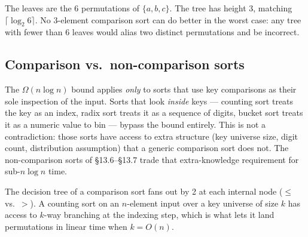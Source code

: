 \documentclass[11pt]{article}
\begin{document}
\begin{center}
\end{center}

The leaves are the 6 permutations of $\{a, b, c\}$. The tree has
height 3, matching $\lceil \log_2 6 \rceil$. No 3-element
comparison sort can do better in the worst case: any tree with
fewer than 6 leaves would alias two distinct permutations and be
incorrect.

\subsection*{Comparison vs.\ non-comparison sorts}

\begin{notebox}
The $\Omega(n \log n)$ bound applies \emph{only} to sorts that use
key comparisons as their sole inspection of the input. Sorts that
look \emph{inside} keys --- counting sort treats the key as an
index, radix sort treats it as a sequence of digits, bucket sort
treats it as a numeric value to bin --- bypass the bound entirely.
This is not a contradiction: those sorts have access to extra
structure (key universe size, digit count, distribution
assumption) that a generic comparison sort does not. The
non-comparison sorts of \S13.6--\S13.7 trade that extra-knowledge
requirement for sub-$n \log n$ time.

The decision tree of a comparison sort fans out by 2 at each
internal node ($\le$ vs.\ $>$). A counting sort on an $n$-element
input over a key universe of size $k$ has access to $k$-way
branching at the indexing step, which is what lets it land
permutations in linear time when $k = O(n)$.
\end{notebox}
\end{document}

